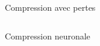 \documentclass[9pt, aspectratio=169]{beamer}
\begin{document}
\begin{frame}{Compression avec pertes} %
\begin{columns}
   \begin{column}{0.48\textwidth}
   \end{column}
   \begin{column}{0.48\textwidth}
   \end{column}
\end{columns}
\end{frame}

\begin{frame}{Compression neuronale} %
\begin{columns}
   \begin{column}{0.48\textwidth}
   \end{column}
   \begin{column}{0.48\textwidth}
   \end{column}
\end{columns}
\end{frame}


%
\end{document}
